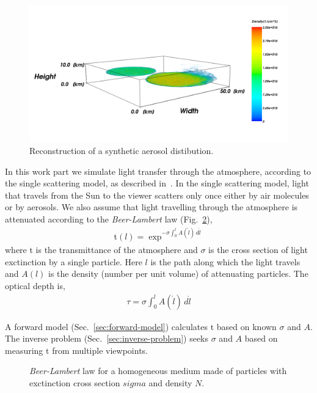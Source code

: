 \documentclass[10pt,twocolumn,letterpaper]{article}
\newcommand{\derivsym}[1]{\,d{#1}}
\begin{document}
\begin{figure}
  \centering
    \includegraphics[width=\columnwidth]{images/front.png}
    \caption{Reconstruction of a synthetic aerosol distibution.}
  \label{fig:front}
\end{figure}
In this work part we simulate light transfer through the atmosphere,
according to the single scattering model, as described
in~\cite{Levi1980}. In the single scattering model, light that travels
from the Sun to the viewer scatters only once either by air molecules
or by aerosols. We also assume that light travelling through the
atmosphere is attenuated according to the {\em Beer-Lambert} law
(Fig.~\ref{fig:beer_lambert}),
\begin{align}
  \mathrm{t}(l)=\exp^{-\sigma \int_{0}^l
    A(\acute{l})\derivsym{\acute{l}}}
  \label{eq:beer-lambert}
\end{align}
where $\mathrm{t}$ is the transmittance of the atmosphere and $\sigma$
is the cross section of light exctinction by a single particle. Here
$l$ is the path along which the light travels and $A(l)$ is the
density (number per unit volume) of attenuating particles. The optical
depth is,
\begin{align}
  \tau = \sigma \int_{0}^l A(\acute{l})\derivsym{\acute{l}}
  \label{eq:tau_definition}
\end{align}

A forward model (Sec.~\ref{sec:forward-model}) calculates $\mathrm{t}$
based on known $\sigma$ and $A$. The inverse problem
(Sec.~\ref{sec:inverse-problem}) seeks $\sigma$ and $A$ based on
measuring $\mathrm{t}$ from multiple viewpoints.

\begin{figure}
  \centering {}
  
  \caption{\emph{Beer-Lambert} law for a homogeneous medium made of
    particles with exctinction cross section $sigma$ and density $N$.}
  \label{fig:beer_lambert}
\end{figure}
\end{document}
